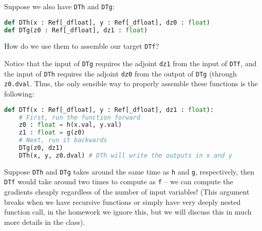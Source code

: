 Suppose we also have \lstinline{DTh} and \lstinline{DTg}:
\begin{lstlisting}[language=Python]
def DTh(x : Ref[_dfloat], y : Ref[_dfloat], dz0 : float)
def DTg(z0 : Ref[_dfloat], dz1 : float)
\end{lstlisting}
How do we use them to assemble our target \lstinline{DTf}?

Notice that the input of \lstinline{DTg} requires the adjoint \lstinline{dz1} from the input of \lstinline{DTf}, and the input of \lstinline{DTh} requires the adjoint \lstinline{dz0} from the output of \lstinline{DTg} (through \lstinline{z0.dval}. Thus, the only sensible way to properly assemble these functions is the following:
\begin{lstlisting}[language=Python]
def DTf(x : Ref[_dfloat], y : Ref[_dfloat], dz1 : float):
	# First, run the function forward
	z0 : float = h(x.val, y.val)
	z1 : float = g(z0)
	# Next, run it backwards
	DTg(z0, dz1)
	DTh(x, y, z0.dval) # DTh will write the outputs in x and y 
\end{lstlisting}
Suppose \lstinline{DTh} and \lstinline{DTg} takes around the same time as \lstinline{h} and \lstinline{g}, respectively, then \lstinline{DTf} would take around two times to compute as \lstinline{f} -- we can compute the gradients cheaply regardless of the number of input variables! (This argument breaks when we have recursive functions or simply have very deeply nested function call, in the homework we ignore this, but we will discuss this in much more details in the class).

